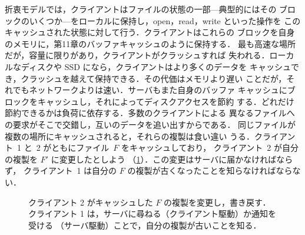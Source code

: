 \documentclass[../main.tex]{subfiles}
\begin{document}
折衷モデルでは，クライアントはファイルの状態の一部---典型的にはその
ブロックのいくつか---をローカルに保持し，open，read，write といった操作を
このキャッシュされた状態に対して行う．クライアントはこれらの
ブロックを自身のメモリに，第11章のバッファキャッシュのように保持する．
最も高速な場所だが，容量に限りがあり，クライアントがクラッシュすれば
失われる．ローカルなディスクや SSD になら，クライアントはより多くのデータを
キャッシュでき，クラッシュを越えて保持できる．その代価はメモリより遅い
ことだが，それでもネットワークよりは速い．サーバもまた自身のバッファ
キャッシュにブロックをキャッシュし，それによってディスクアクセスを節約
する．どれだけ節約できるかは負荷に依存する．多数のクライアントによる
異なるファイルへの要求がそこで交錯し，互いのデータを追い出すからである．
同じファイルが複数の場所にキャッシュされると，それらの複製は食い違い
うる．クライアント~1 と~2 がともにファイル~$F$ をキャッシュしており，
クライアント~2 が自分の複製を $F'$ に変更したとしよう
（\cref{fig:l14-caching}）．この変更はサーバに届かなければならず，
クライアント~1 は自分の $F$ の複製が古くなったことを知らなければならない．

\begin{figure}[htbp]
  \centering
  
  \caption{クライアント 2 がキャッシュした $F$ の複製を変更し，書き戻す．
    クライアント 1 は，サーバに尋ねる（クライアント駆動）か通知を受ける
    （サーバ駆動）ことで，自分の複製が古いことを知る．}
  \label{fig:l14-caching}
\end{figure}
\end{document}
